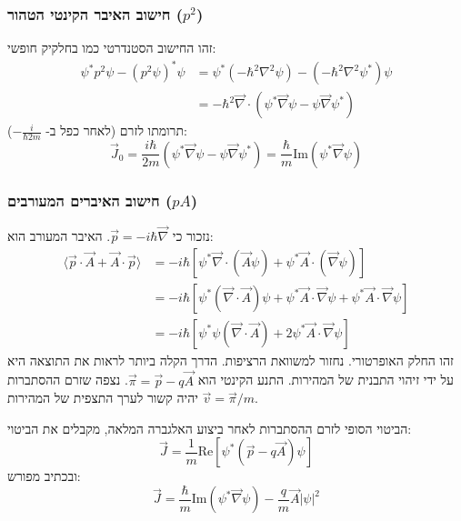 \subsubsection*{חישוב האיבר הקינטי הטהור ($p^2$)}
זהו החישוב הסטנדרטי כמו בחלקיק חופשי:
\begin{align}
\psi^* p^2 \psi - (p^2 \psi)^* \psi &= \psi^* (-\hbar^2 \nabla^2 \psi) - (-\hbar^2 \nabla^2 \psi^*)\psi \nonumber \\
&= -\hbar^2 \vec{\nabla} \cdot (\psi^* \vec{\nabla}\psi - \psi \vec{\nabla}\psi^*)
\end{align}
תרומתו לזרם (לאחר כפל ב- $-\frac{i}{\hbar 2m}$):
\begin{equation}
\vec{J}_0 = \frac{i\hbar}{2m}(\psi^* \vec{\nabla}\psi - \psi \vec{\nabla}\psi^*) = \frac{\hbar}{m} \text{Im}(\psi^* \vec{\nabla}\psi)
\end{equation}

\subsubsection*{חישוב האיברים המעורבים ($pA$)}
נזכור כי $\vec{p} = -i\hbar\vec{\nabla}$. האיבר המעורב הוא:
\begin{align}
\langle \vec{p}\cdot\vec{A} + \vec{A}\cdot\vec{p} \rangle &= -i\hbar \left[ \psi^* \vec{\nabla}\cdot(\vec{A}\psi) + \psi^*\vec{A}\cdot(\vec{\nabla}\psi) \right] \nonumber \\
&= -i\hbar \left[ \psi^* (\vec{\nabla}\cdot\vec{A})\psi + \psi^*\vec{A}\cdot\vec{\nabla}\psi + \psi^*\vec{A}\cdot\vec{\nabla}\psi \right] \nonumber \\
&= -i\hbar \left[ \psi^* \psi (\vec{\nabla}\cdot\vec{A}) + 2\psi^*\vec{A}\cdot\vec{\nabla}\psi \right]
\end{align}
זהו החלק האופרטורי. נחזור למשוואת הרציפות. הדרך הקלה ביותר לראות את התוצאה היא על ידי זיהוי התבנית של המהירות.
התנע הקינטי הוא $\vec{\pi} = \vec{p} - q\vec{A}$. נצפה שזרם ההסתברות יהיה קשור לערך התצפית של המהירות $\vec{v} = \vec{\pi}/m$.

\begin{resultbox}{הביטוי הסופי לזרם ההסתברות}
לאחר ביצוע האלגברה המלאה, מקבלים את הביטוי:
\begin{equation}
\vec{J} = \frac{1}{m} \text{Re}\left[ \psi^* (\vec{p} - q\vec{A})\psi \right]
\end{equation}
ובכתיב מפורש:
\begin{equation}
\boxed{\vec{J} = \frac{\hbar}{m} \text{Im}(\psi^* \vec{\nabla}\psi) - \frac{q}{m}\vec{A}|\psi|^2}
\end{equation}
\end{resultbox}

